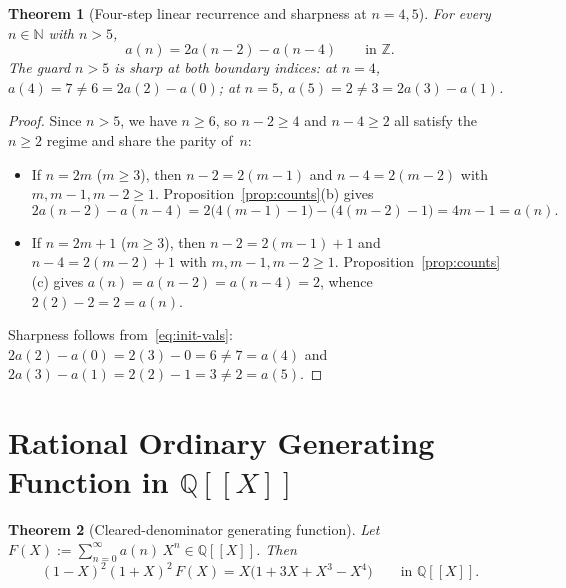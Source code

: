 \documentclass[11pt]{article}
\newcommand{\llbracket}{[\![}
\newcommand{\rrbracket}{]\!]}
\newtheorem{theorem}{Theorem}[section]
\theoremstyle{definition}
\newcommand{\N}{\mathbb{N}}
\newcommand{\Z}{\mathbb{Z}}
\newcommand{\Q}{\mathbb{Q}}
\begin{document}
\begin{theorem}[Four-step linear recurrence and sharpness at $n = 4, 5$]
\label{thm:recurrence}
For every $n \in \N$ with $n > 5$,
\[
a(n) = 2a(n - 2) - a(n - 4) \qquad \text{in }\Z.
\]
The guard $n > 5$ is sharp at both boundary indices: at $n = 4$, $a(4) = 7 \ne 6 = 2a(2) - a(0)$; at $n = 5$, $a(5) = 2 \ne 3 = 2a(3) - a(1)$.
\end{theorem}

\begin{proof}
Since $n > 5$, we have $n \ge 6$, so $n - 2 \ge 4$ and $n - 4 \ge 2$ all satisfy the $n \ge 2$ regime and share the parity of~$n$:
\begin{itemize}
\item If $n = 2m$ ($m \ge 3$), then $n - 2 = 2(m - 1)$ and $n - 4 = 2(m - 2)$ with $m, m - 1, m - 2 \ge 1$. Proposition~\ref{prop:counts}(b) gives
\[
2a(n - 2) - a(n - 4) = 2\bigl(4(m - 1) - 1\bigr) - \bigl(4(m - 2) - 1\bigr) = 4m - 1 = a(n).
\]
\item If $n = 2m + 1$ ($m \ge 3$), then $n - 2 = 2(m - 1) + 1$ and $n - 4 = 2(m - 2) + 1$ with $m, m - 1, m - 2 \ge 1$. Proposition~\ref{prop:counts}(c) gives $a(n) = a(n - 2) = a(n - 4) = 2$, whence $2(2) - 2 = 2 = a(n)$.
\end{itemize}
Sharpness follows from~\eqref{eq:init-vals}: $2a(2) - a(0) = 2(3) - 0 = 6 \ne 7 = a(4)$ and $2a(3) - a(1) = 2(2) - 1 = 3 \ne 2 = a(5)$.
\end{proof}

\section{Rational Ordinary Generating Function in \texorpdfstring{$\Q\llbracket X \rrbracket$}{Q[[X]]}}

\begin{theorem}[Cleared-denominator generating function]
\label{thm:gf}
Let $F(X) := \sum_{n=0}^{\infty} a(n)\,X^n \in \Q\llbracket X \rrbracket$. Then
\begin{equation}
\label{eq:gf-cleared}
(1 - X)^2 (1 + X)^2 \, F(X) = X\bigl(1 + 3X + X^3 - X^4\bigr) \qquad \text{in }\Q\llbracket X \rrbracket.
\end{equation}
\end{theorem}
\end{document}
